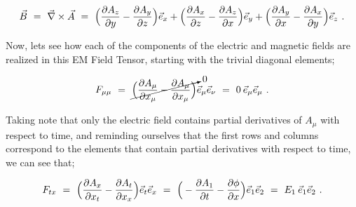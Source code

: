 \documentclass{article}
\begin{document}
\begin{equation} \label{eb-eq-1002-20}
\vec{B} \hspace{0.125cm} = \hspace{0.125cm} \vec{\nabla} \times \vec{A} \hspace{0.125cm} = \hspace{0.125cm} \Big( \frac{\partial{A_z}}{\partial{y}} - \frac{\partial{A_y}}{\partial{z}} \Big) \vec{e}_x + \Big( \frac{\partial{A_x}}{\partial{z}} - \frac{\partial{A_z}}{\partial{x}} \Big) \vec{e}_y + \Big( \frac{\partial{A_y}}{\partial{x}} - \frac{\partial{A_x}}{\partial{y}} \Big) \vec{e}_z \hspace{0.125cm} .
\end{equation}

Now, lets see how each of the components of the electric and magnetic fields are realized in this EM Field Tensor, starting with the trivial diagonal elements;

\begin{equation} \label{eb-eq-1002-21}
F_{\mu \mu} \hspace{0.125cm} = \hspace{0.125cm} \cancelto{0}{\Big( \frac{\partial{A_{\mu}}}{\partial{x_{\mu}}} - \frac{\partial{A_{\mu}}}{\partial{x_{\mu}}} \Big)} \vec{e}_{\mu} \vec{e}_{\nu} \hspace{0.125cm} = \hspace{0.125cm} 0 \hspace{0.075cm} \vec{e}_{\mu} \vec{e}_{\mu} \hspace{0.125cm} .
\end{equation}

Taking note that only the electric field contains partial derivatives of \begin{math} A_{\mu} \end{math} with respect to time, and reminding ourselves that the first rows and columns correspond to the elements that contain partial derivatives with respect to time, we can see that;

\begin{equation} \label{eb-eq-1002-22}
F_{t x} \hspace{0.125cm} = \hspace{0.125cm}  \Big( \frac{\partial{A_{x}}}{\partial{x_{t}}} - \frac{\partial{A_{t}}}{\partial{x_{x}}} \Big) \vec{e}_{t} \vec{e}_{x} \hspace{0.125cm} = \hspace{0.125cm} \Big( - \frac{\partial{A_{1}}}{\partial{t}} - \frac{\partial{\phi}}{\partial{x}} \Big) \vec{e}_{1} \vec{e}_{2} \hspace{0.125cm} = \hspace{0.125cm} E_1 \hspace{0.075cm} \vec{e}_{1} \vec{e}_{2} \hspace{0.125cm} .
\end{equation}
\end{document}
